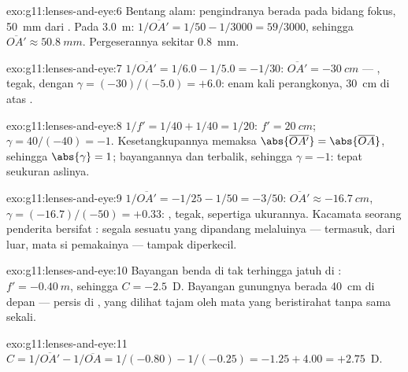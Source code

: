 \begin{solution}{exo:g11:lenses-and-eye:6}
Bentang alam: pengindranya berada pada bidang fokus, \qty{50}{mm} dari
. Pada \qty{3.0}{m}:
$1/\overline{OA'} = 1/50 - 1/3000 = 59/3000$, sehingga
$\overline{OA'} \approx \qty{50.8}{mm}$. Pergeserannya sekitar
\qty{0.8}{mm}.
\end{solution}

\begin{solution}{exo:g11:lenses-and-eye:7}
$1/\overline{OA'} = 1/6.0 - 1/5.0 = -1/30$:
$\overline{OA'} = \qty{-30}{cm}$ --- , tegak, dengan
$\gamma = (-30)/(-5.0) = +6.0$: enam kali perangkonya, \qty{30}{cm} di
atas .
\end{solution}

\begin{solution}{exo:g11:lenses-and-eye:8}
$1/f' = 1/40 + 1/40 = 1/20$: $f' = \qty{20}{cm}$;
$\gamma = 40/(-40) = -1$. Kesetangkupannya memaksa
$\abs{\overline{OA'}} = \abs{\overline{OA}}$, sehingga
$\abs{\gamma} = 1$; bayangannya  dan terbalik, sehingga
$\gamma = -1$: tepat seukuran aslinya.
\end{solution}

\begin{solution}{exo:g11:lenses-and-eye:9}
$1/\overline{OA'} = -1/25 - 1/50 = -3/50$:
$\overline{OA'} \approx \qty{-16.7}{cm}$,
$\gamma = (-16.7)/(-50) = +0.33$: , tegak, sepertiga ukurannya.
Kacamata seorang penderita  bersifat : segala sesuatu yang
dipandang melaluinya --- termasuk, dari luar, mata si pemakainya ---
tampak diperkecil.
\end{solution}

\begin{solution}{exo:g11:lenses-and-eye:10}
Bayangan benda di tak terhingga jatuh di :
$f' = \qty{-0.40}{m}$, sehingga $C = -2.5$~D. Bayangan gunungnya berada
\qty{40}{cm} di depan  --- persis di , yang
dilihat tajam oleh mata yang beristirahat tanpa  sama sekali.
\end{solution}

\begin{solution}{exo:g11:lenses-and-eye:11}
$C = 1/\overline{OA'} - 1/\overline{OA} = 1/(-0.80) - 1/(-0.25)
= -1.25 + 4.00 = +2.75$~D.
\end{solution}


